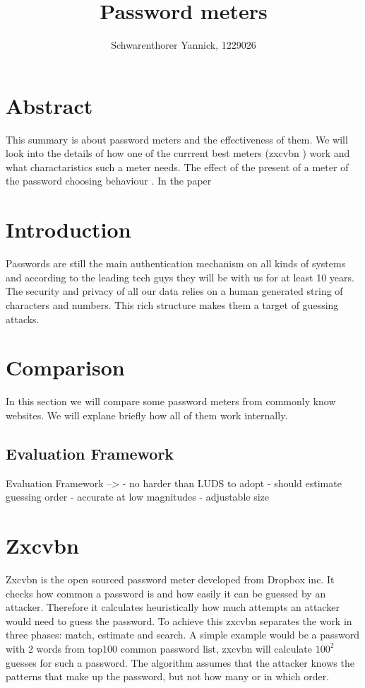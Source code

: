 \documentclass[12pt,a4paper]{article}
\author{Schwarenthorer Yannick, 1229026}
\title{\vspace{-3cm}Password meters}
\begin{document}
\maketitle

\section*{Abstract}
\label{sec:abstract}
This summary is about password meters and the effectiveness of them. 
We will look into the details of how one of the currrent best meters (zxcvbn \cite{zxcvbn}) work and what charactaristics such a meter needs. The effect of the present of a meter of the password choosing behaviour \cite{upToEleven}. In the paper 

\tableofcontents 


\section{Introduction}
\label{sec:introduction}
Passwords are still the main authentication mechanism on all kinds of systems and according to the leading tech guys they will be with us for at least 10 years.
The security and privacy of all our data relies on a human generated string of characters and numbers.
This rich structure makes them a target of guessing attacks.


\section{Comparison}
\label{sec:Comparison}
In this section we will compare some password meters from commonly know websites. We will explane briefly how all of them work internally.

\subsection{Evaluation Framework}

Evaluation Framework --> 
- no harder than LUDS to adopt
- should estimate guessing order
- accurate at low magnitudes
- adjustable size


\section{Zxcvbn}
\label{sec:zxcvbn}
Zxcvbn is the open sourced password meter developed from Dropbox inc. It checks how common a password is and how easily it can be guessed by an attacker. Therefore it calculates heuristically how much attempts an attacker would need to guess the password. To achieve this zxcvbn separates the work in three phases: match, estimate and search. A simple example would be a password with 2 words from top100 common password list, zxcvbn will calculate $ 100^{2} $ guesses for such a password. The algorithm assumes that the attacker knows the patterns that make up the password, but not how many or in which order.
\end{document}
